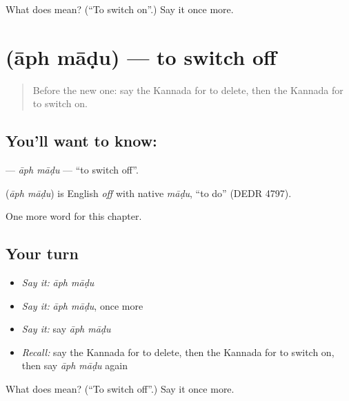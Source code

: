 \begin{tcolorbox}[breakable,colback=teal!4,colframe=teal!35!black,title={Before you move on}]
What does   mean? (\textquotedblleft{}To switch on\textquotedblright{}.) Say it once more.
\end{tcolorbox}
\section[\texorpdfstring{\kn{ಆಫ್} \kn{ಮಾಡು} (āph māḍu)}{ಆಫ್ ಮಾಡು (āph māḍu)}]{  (āph māḍu) — to switch off}

\label{lesson:KA-C164-aph-madu}



\begin{quote}
Before the new one: say the Kannada for to delete, then the Kannada for to switch on.
\end{quote}

\subsection*{You'll want to know:  }
\textbf{ } — \emph{āph māḍu} — \textquotedblleft{}to switch off\textquotedblright{}.

\begin{cousinweb}
\textbf{ } (\emph{āph māḍu}) is English \emph{off} with native \emph{māḍu}, \textquotedblleft{}to do\textquotedblright{} (DEDR 4797).
\end{cousinweb}

\begin{grammarlens}[title={What you've built}]
One more word for this chapter.
\end{grammarlens}

\subsection*{Your turn}
\begin{itemize}
\raggedright
  \item \emph{Say it:} \emph{āph māḍu}
  \item \emph{Say it:} \emph{āph māḍu}, once more
  \item \emph{Say it:} say \emph{āph māḍu}
  \item \emph{Recall:} say the Kannada for to delete, then the Kannada for to switch on, then say \emph{āph māḍu} again
\end{itemize}

\begin{tcolorbox}[breakable,colback=teal!4,colframe=teal!35!black,title={Before you move on}]
What does   mean? (\textquotedblleft{}To switch off\textquotedblright{}.) Say it once more.
\end{tcolorbox}
